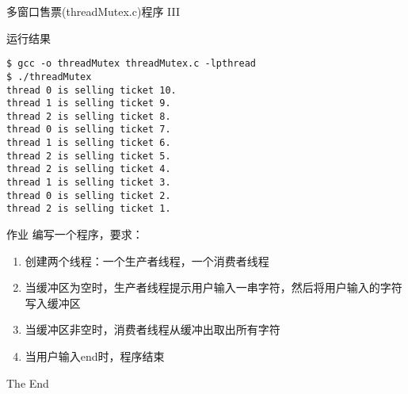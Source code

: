 \documentclass{beamer}
\begin{document}
\begin{frame}[fragile]{多窗口售票(threadMutex.c)程序 III}
\begin{block}{运行结果}
\begin{verbatim}
$ gcc -o threadMutex threadMutex.c -lpthread
$ ./threadMutex 
thread 0 is selling ticket 10.
thread 1 is selling ticket 9.
thread 2 is selling ticket 8.
thread 0 is selling ticket 7.
thread 1 is selling ticket 6.
thread 2 is selling ticket 5.
thread 2 is selling ticket 4.
thread 1 is selling ticket 3.
thread 0 is selling ticket 2.
thread 2 is selling ticket 1.
\end{verbatim}
\end{block}
\end{frame}

\begin{frame}{作业}
编写一个程序，要求：
\begin{enumerate}
\item
创建两个线程：一个生产者线程，一个消费者线程
\item
当缓冲区为空时，生产者线程提示用户输入一串字符，然后将用户输入的字符写入缓冲区
\item
当缓冲区非空时，消费者线程从缓冲出取出所有字符
\item
当用户输入end时，程序结束
\end{enumerate}
\end{frame}

\begin{frame}
\Huge{\centerline{The End}}
\end{frame}
\end{document}
